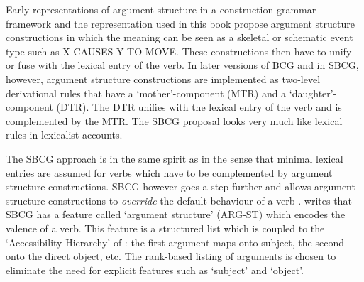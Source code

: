 Early representations of argument structure in a construction grammar framework \citep[such as][]{goldberg95construction} and the representation used in this book propose argument structure constructions in which the meaning can be seen as a skeletal or schematic event type such as X-CAUSES-Y-TO-MOVE. These constructions then have to unify or fuse with the lexical entry of the verb. In later versions of BCG and in SBCG, however, argument structure constructions are implemented as two-level derivational rules that have a `mother'-component (MTR) and a `daughter'-component (DTR). The DTR unifies with the lexical entry of the verb and is complemented by the MTR. The SBCG proposal looks very much like lexical rules in lexicalist accounts.

The SBCG approach is in the same spirit as \citet{goldberg95construction} in the sense that minimal lexical entries are assumed for verbs which have to be complemented by argument structure constructions. SBCG however goes a step further and allows argument structure constructions to {\em override} the default behaviour of a verb \citep{michaelis06complementation, sag07sbcg}. \citet{sag07sbcg} writes that SBCG has a feature called `argument structure' (ARG-ST) which encodes the valence of a verb. This feature is a structured list which is coupled to the `Accessibility Hierarchy' of \citet{keenan77noun}: the first argument maps onto subject, the second onto the direct object, etc. The rank-based listing of arguments is chosen to eliminate the need for explicit features such as `subject' and `object'.

